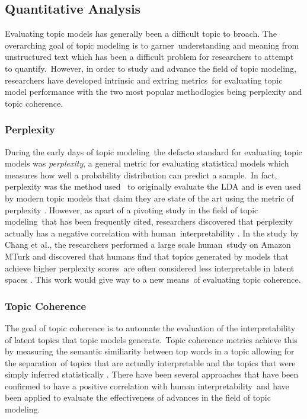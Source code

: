 \documentclass[letterpaper,12pt]{article}
\begin{document}
\subsection{Quantitative Analysis}
Evaluating topic models has generally been a difficult topic to broach. The overarching goal of topic modeling is to garner\
understanding and meaning from unstructured text which has been a difficult problem for researchers to attempt to quantify.\
However, in order to study and advance the field of topic modeling, researchers have developed intrinsic and extring metrics\
for evaluating topic model performance with the two most popular methodlogies being perplexity and topic coherence.
\subsubsection{Perplexity}
During the early days of topic modeling\
the defacto standard for evaluating topic models was \emph{perplexity}, a general metric for evaluating statistical models
which measures how well a probability distribution can predict a sample.\ In fact, perplexity was the method used \	
to originally evaluate the LDA and is even used by modern topic models that claim they are state of the art using the
metric of perplexity \cite{kesiraju2019learning}. However, as apart of a pivoting study in the field of topic modeling\
that has been frequently cited, researchers discovered that perplexity actually has a negative correlation with human\
interpretability \cite{chang2009reading}. In the study by Chang et al., the researchers performed a large scale human\
study on Amazon MTurk and discovered that humans find that topics generated by models that achieve higher perplexity scores\
are often considered less interpretable in latent spaces \cite{chang2009reading}. This work would give way to a new means\
of evaluating topic coherence.

\subsubsection{Topic Coherence}
The goal of topic coherence is to automate the evaluation of the interpretability of latent topics that topic models generate.\
Topic coherence metrics achieve this by measuring the semantic similiarity between top words in a topic allowing for the separation\
of topics that are actually interpretable and the topics that were simply inferred statistically \cite{stevens2012exploring}.
There have been several approaches that have been confirmed to have a positive correlation with human interpretability\
and have been applied to evaluate the effectiveness of advances in the field of topic modeling.
\end{document}
